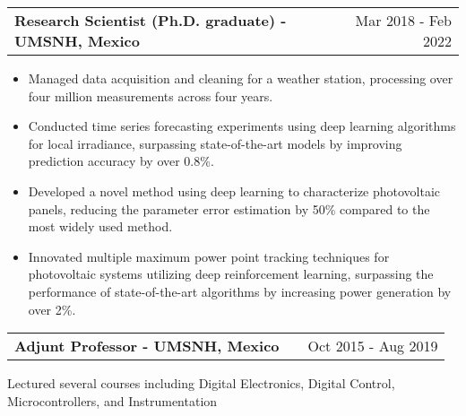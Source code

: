 \documentclass[a4paper,10pt]{article}
\makeatletter
\newenvironment{jobshort}[2]
    {
    \begin{tabularx}{\linewidth}{@{}l X r@{}}
    \textbf{#1} & \hfill &  #2 \\[3.75pt]
    \end{tabularx}
    }
    {
    }
\newenvironment{joblong}[2]
    {
    \begin{tabularx}{\linewidth}{@{}l X r@{}}
    \textbf{#1} & \hfill &  #2 \\[3.75pt]
    \end{tabularx}
    \begin{minipage}[t]{\linewidth}
    \begin{itemize}[nosep,after=\strut, leftmargin=1em, itemsep=3pt,label=--]
    }
    {
    \end{itemize}
    \end{minipage}    
    }
\makeatother
\begin{document}
\begin{joblong}{Research Scientist (Ph.D. graduate) - UMSNH, Mexico}{Mar 2018 - Feb 2022}
\item Managed data acquisition and cleaning for a weather station, processing over four million measurements across four years.
\item Conducted time series forecasting experiments using deep learning algorithms for local irradiance, surpassing state-of-the-art models by improving prediction accuracy by over 0.8\%.
\item Developed a novel method using deep learning to characterize photovoltaic panels, reducing the parameter error estimation by 50\% compared to the most widely used method.
\item Innovated multiple maximum power point tracking techniques for photovoltaic systems utilizing deep reinforcement learning, surpassing the performance of state-of-the-art algorithms by increasing power generation by over 2\%.
\end{joblong}

\begin{jobshort}{Adjunt Professor - UMSNH, Mexico}{Oct 2015 - Aug 2019}
Lectured several courses including Digital Electronics, Digital Control, Microcontrollers, and Instrumentation
\end{jobshort}



\end{document}
